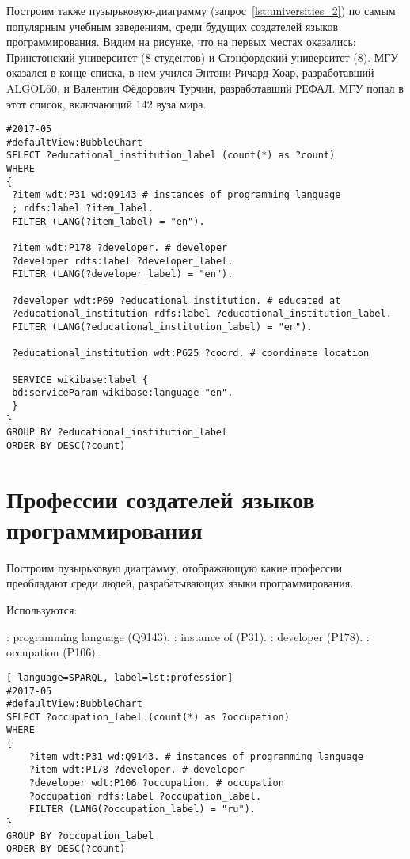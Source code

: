 Построим также пузырьковую-диаграмму (запрос~\ref{lst:universities_2}) по самым популярным учебным заведениям, среди будущих создателей языков программирования. Видим на рисунке, что на первых местах оказались: Принстонский университет (8 студентов) и Стэнфордский университет (8). МГУ оказался в конце списка, в нем учился Энтони Ричард Хоар, разработавший ALGOL60, и Валентин Фёдорович Турчин, разработавший РЕФАЛ. МГУ попал в этот список, включающий 142 вуза мира.

\begin{lstlisting}[language=SPARQL, label=lst:universities_2]
#2017-05
#defaultView:BubbleChart
SELECT ?educational_institution_label (count(*) as ?count)
WHERE
{
 ?item wdt:P31 wd:Q9143 # instances of programming language
 ; rdfs:label ?item_label. 
 FILTER (LANG(?item_label) = "en"). 
 
 ?item wdt:P178 ?developer. # developer
 ?developer rdfs:label ?developer_label. 
 FILTER (LANG(?developer_label) = "en"). 
 	
 ?developer wdt:P69 ?educational_institution. # educated at
 ?educational_institution rdfs:label ?educational_institution_label. 
 FILTER (LANG(?educational_institution_label) = "en").
 
 ?educational_institution wdt:P625 ?coord. # coordinate location
 
 SERVICE wikibase:label {
 bd:serviceParam wikibase:language "en".
 } 	
}
GROUP BY ?educational_institution_label
ORDER BY DESC(?count)
\end{lstlisting}

\section{Профессии создателей языков программирования}
Построим пузырьковую диаграмму, отображающую какие профессии преобладают среди людей, разрабатывающих языки программирования.

Используются:
\begin{itemize}
: programming language (Q9143).
: instance of (P31).
: developer (P178).
: occupation (P106).
\end{itemize}

\begin{lstlisting}[ language=SPARQL, label=lst:profession]
#2017-05
#defaultView:BubbleChart
SELECT ?occupation_label (count(*) as ?occupation)
WHERE
{
    ?item wdt:P31 wd:Q9143. # instances of programming language 
    ?item wdt:P178 ?developer. # developer
    ?developer wdt:P106 ?occupation. # occupation
    ?occupation rdfs:label ?occupation_label. 
    FILTER (LANG(?occupation_label) = "ru"). 
}
GROUP BY ?occupation_label 
ORDER BY DESC(?count)
\end{lstlisting}


